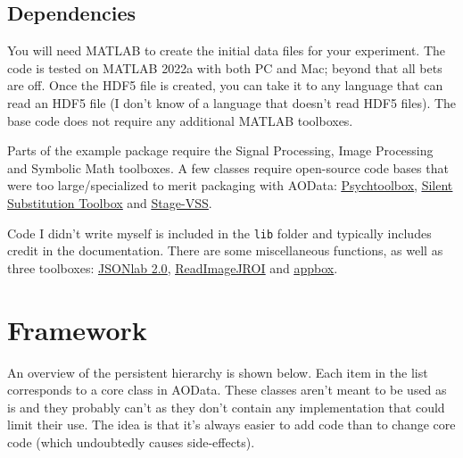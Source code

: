 \documentclass[10pt]{exam}
\newcommand\myurl[1]{\textcolor{blue}{\underline{#1}}}
\begin{document}
	\subsection{Dependencies}
		\noindent You will need MATLAB to create the initial data files for your experiment. The code is tested on MATLAB 2022a with both PC and Mac; beyond that all bets are off. Once the HDF5 file is created, you can take it to any language that can read an HDF5 file (I don't know of a language that doesn't read HDF5 files). The base code does not require any additional MATLAB toolboxes. 
		
		Parts of the example package require the Signal Processing, Image Processing and Symbolic Math toolboxes. A few classes require open-source code bases that were too large/specialized to merit packaging with AOData: \myurl{\href{https://github.com/Psychtoolbox-3/Psychtoolbox-3}{Psychtoolbox}}, \myurl{\href{https://github.com/spitschan/SilentSubstitutionToolbox}{Silent Substitution Toolbox}} and \myurl{\href{https://github.com/Stage-VSS/stage}{Stage-VSS}}. 
		
		Code I didn't write myself is included in the \texttt{lib} folder and typically includes credit in the documentation. There are some miscellaneous functions, as well as three toolboxes: \myurl{\href{https://www.mathworks.com/matlabcentral/fileexchange/33381-jsonlab-a-toolbox-to-encode-decode-json-files?s_tid=ta_fx_results}{JSONlab 2.0}}, \myurl{\href{https://github.com/DylanMuir/ReadImageJROI}{ReadImageJROI}} and \myurl{\href{https://github.com/cafarm/appbox}{appbox}}. 
	 

\section{Framework}\label{section:Framework}
	\noindent An overview of the persistent hierarchy is shown below. Each item in the list corresponds to a core class in AOData. These classes aren't meant to be used as is and they probably can't as they don't contain any implementation that could limit their use. The idea is that it's always easier to add code than to change core code (which undoubtedly causes side-effects). 
	
\end{document}
